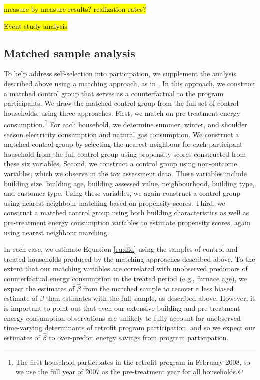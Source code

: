 \documentclass{article}
\newcommand{\hlc}[2][yellow]{ {\sethlcolor{#1} \hl{#2}} }
\begin{document}
\hlc{measure by measure results? realization rates?}

\hlc{Event study analysis}

\subsection{Matched sample analysis}

To help address self-selection into participation, we supplement the analysis described above using a matching approach, as in \cite{chuang2022residential}. In this approach, we construct a matched control group that serves as a counterfactual to the program participants. We draw the matched control group from the full set of control households, using three approaches.  First, we match on pre-treatment energy consumption.\footnote{The first household participates in the retrofit program in February 2008, so we use the full year of 2007 as the pre-treatment year for all households.} For each household, we determine summer, winter, and shoulder season electricity consumption and natural gas consumption. We construct a matched control group by selecting the nearest neighbour for each participant household from the full control group using propensity scores constructed from these six variables.  Second, we construct a control group using non-outcome variables, which we observe in the tax assessment data.  These variables include building size, building age, building assessed value, neighbourhood, building type, and customer type. Using these variables, we again construct a control group using nearest-neighbour matching based on propensity scores.  Third, we construct a matched control group using both building characteristics as well as pre-treatment energy consumption variables to estimate propensity scores, again using nearest neighbour marching.

In each case, we estimate Equation \eqref{eq:did} using the samples of control and treated households produced by the matching approaches described above. To the extent that our matching variables are correlated with unobserved predictors of counterfactual energy consumption in the treated period (e.g., furnace age), we expect the estimates of $\hat{\beta}$ from the matched sample to recover a less biased estimate of $\beta$ than estimates with the full sample, as described above. However, it is important to point out that even our extensive building and pre-treatment energy consumption observations are unlikely to fully account for unobserved time-varying determinants of retrofit program participation, and so we expect our estimates of $\hat{\beta}$ to over-predict energy savings from program participation.
\end{document}
